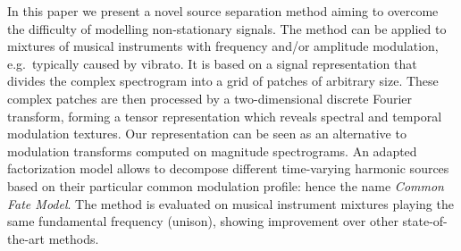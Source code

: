 %


%


In this paper we present a novel source separation method aiming to overcome the difficulty of modelling non-stationary signals. The method can be applied to mixtures of musical instruments with frequency and/or amplitude modulation, e.g.\ typically caused by vibrato. It is based on a signal representation that divides the complex spectrogram into a grid of patches of arbitrary size. These complex patches are then processed by a two-dimensional discrete Fourier transform, forming a tensor representation which reveals spectral and temporal modulation textures. Our representation can be seen as an alternative to modulation transforms computed on magnitude spectrograms. An adapted factorization model allows to decompose different time-varying harmonic sources based on their particular common modulation profile: hence the name \emph{Common Fate Model}. The method is evaluated on musical instrument mixtures playing the same fundamental frequency (unison), showing improvement over other state-of-the-art methods.








